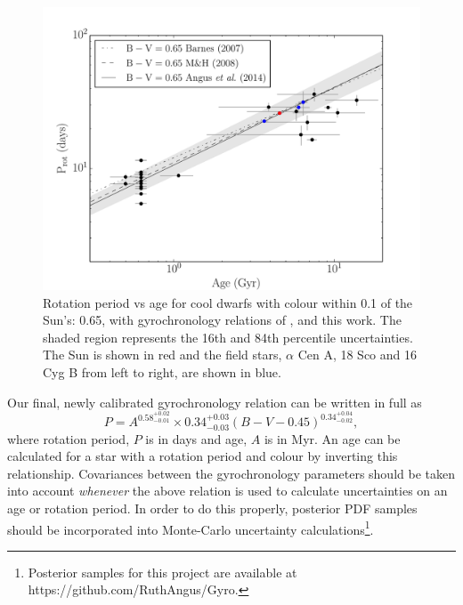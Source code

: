 \documentclass[useAMS, usenatbib]{mn2e}
\newcommand{\gyroa}{0.34}
\newcommand{\aerrp}{0.03}
\newcommand{\aerrm}{0.03}
\newcommand{\gyron}{0.58}
\newcommand{\nerrp}{0.02}
\newcommand{\nerrm}{0.01}
\newcommand{\gyrob}{0.34}
\newcommand{\berrp}{0.04}
\newcommand{\berrm}{0.02}
\begin{document}
\begin{figure}
\begin{center}
\includegraphics[width=6in, clip=true, trim=0 0 0.5in 0]{p_vs_a_solar.pdf}
\caption{Rotation period vs age for cool dwarfs with colour within 0.1 of the
	Sun's: 0.65, with gyrochronology relations of \citet{Barnes2007},
	\citet{Mamajek2008} and this work. The shaded region represents the
	16th and 84th percentile uncertainties. The Sun is shown in red and the
	field stars, $\alpha$ Cen A, 18 Sco and 16 Cyg B from left to right,
	are shown in blue.
\label{fig:p_vs_a_solar}}
\end{center}
\end{figure}

Our final, newly calibrated gyrochronology relation can be written in full as
\begin{equation}
	P = A^{\gyron^{+\nerrp}_{-\nerrm}} \times \gyroa^{+\aerrp}_{-\aerrm}
	(B-V-0.45)^{\gyrob^{+\berrp}_{-\berrm}},
\label{eq:Barnes2007_3}
\end{equation}
where rotation period, $P$ is in days and age, $A$ is in Myr.
An age can be calculated for a star with a rotation period and colour by
inverting this relationship.
Covariances between the gyrochronology parameters should
be taken into account {\it whenever} the above relation is used to calculate
uncertainties on an age or rotation period.
In order to do this properly, posterior PDF samples should be incorporated
into Monte-Carlo uncertainty calculations\footnote{Posterior samples for
this project are available at https://github.com/RuthAngus/Gyro.}.
\end{document}
